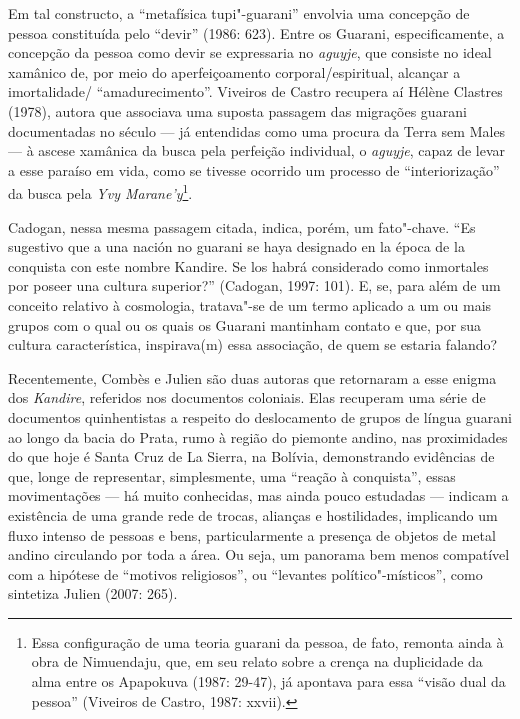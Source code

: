 Em tal constructo, a ``metafísica tupi"-guarani'' envolvia uma concepção de
pessoa constituída pelo ``devir'' (1986: 623). Entre os Guarani,
especificamente, a concepção da pessoa como devir se expressaria no
\emph{aguyje}, que consiste no ideal xamânico de, por meio do aperfeiçoamento
corporal/espiritual, alcançar a imortalidade/ ``amadurecimento''.
Viveiros de Castro recupera aí Hélène Clastres (1978), autora que
associava uma suposta passagem das migrações guarani documentadas no
século  --- já entendidas como uma procura da Terra sem Males --- à
ascese xamânica da busca pela perfeição individual, o \emph{aguyje}, capaz de
levar a esse paraíso em vida, como se tivesse ocorrido um processo de
``interiorização'' da busca pela \emph{Yvy Marane’y}\footnote{Essa configuração
de uma teoria guarani da pessoa, de fato, remonta ainda à obra de
Nimuendaju, que, em seu relato sobre a crença na duplicidade da alma
entre os Apapokuva (1987: 29-47), já apontava para essa ``visão dual da
pessoa'' (Viveiros de Castro, 1987: xxvii).}.

Cadogan, nessa mesma passagem citada, indica, porém, um fato"-chave. ``Es
sugestivo que a una nación no guarani se haya designado en la época de
la conquista con este nombre Kandire. Se los habrá considerado como
inmortales por poseer una cultura superior?'' (Cadogan, 1997: 101). E,
se, para além de um conceito relativo à cosmologia, tratava"-se de um
termo aplicado a um ou mais grupos com o qual ou os quais os Guarani
mantinham contato e que, por sua cultura característica, inspirava(m)
essa associação, de quem se estaria falando?

Recentemente, Combès e Julien são duas autoras que retornaram a esse
enigma dos \emph{Kandire}, referidos nos documentos coloniais. Elas recuperam
uma série de documentos quinhentistas a respeito do deslocamento de
grupos de língua guarani ao longo da bacia do Prata, rumo à região do
piemonte andino, nas proximidades do que hoje é Santa Cruz de La
Sierra, na Bolívia, demonstrando evidências de que, longe de
representar, simplesmente, uma ``reação à conquista'', essas
movimentações --- há muito conhecidas, mas ainda pouco estudadas ---
indicam a existência de uma grande rede de trocas, alianças e
hostilidades, implicando um fluxo intenso de pessoas e bens,
particularmente a presença de objetos de metal andino circulando por
toda a área. Ou seja, um panorama bem menos compatível com a hipótese
de ``motivos religiosos'', ou ``levantes político"-místicos'', como
sintetiza Julien (2007: 265).

